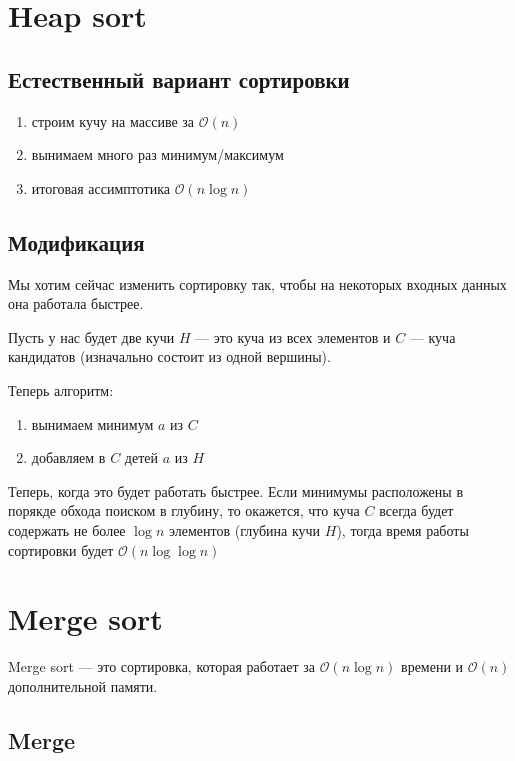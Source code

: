 \documentclass[10pt,a4paper]{article}
\renewcommand{\O}{\mathcal{O}}
\begin{document}
\section{Heap sort}

\subsection{Естественный вариант сортировки}

\begin{enumerate}
\item строим кучу на массиве за $\O(n)$
\item вынимаем много раз минимум/максимум
\item итоговая ассимптотика $\O(n \log n)$
\end{enumerate}

\subsection{Модификация}

Мы хотим сейчас изменить сортировку так, чтобы на некоторых входных 
данных она работала быстрее.

Пусть у нас будет две кучи $H$ --- это куча из всех элементов и $C$ 
--- куча кандидатов (изначально состоит из одной вершины).

Теперь алгоритм:
\begin{enumerate}
\item вынимаем минимум $a$ из $C$
\item добавляем в $C$ детей $a$ из $H$
\end{enumerate}

Теперь, когда это будет работать быстрее. Если минимумы расположены в 
порякде обхода поиском в глубину, то окажется, что куча $C$ всегда 
будет содержать не более $\log n$ элементов (глубина кучи $H$), тогда 
время работы сортировки будет $\O(n \log \log n)$

\section{Merge sort}

Merge sort ---  это сортировка, которая работает за $\O(n \log n)$ 
времени и $\O(n)$ дополнительной памяти.

\subsection{Merge}
\end{document}
